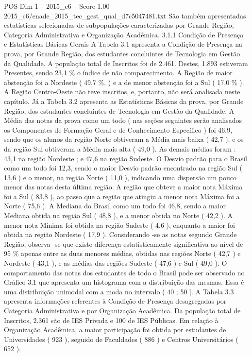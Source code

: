 \begin{textsample}{POS Dim 1 – 2015\_c6 – Score 1.00 – 2015\_c6/enade\_2015\_tec\_gest\_qual\_d7c5047481.txt}
São também apresentadas estatísticas selecionadas de subpopulações caracterizadas por Grande Região, Categoria Administrativa e Organização Acadêmica. 3.1.1 Condição de Presença e Estatísticas Básicas Gerais A Tabela 3.1 apresenta a Condição de Presença na prova, por Grande Região, dos estudantes concluintes de Tecnologia em Gestão da Qualidade.
A população total de Inscritos foi de 2.461.
Destes, 1.893 estiveram Presentes, sendo 23,1 \% o índice de não comparecimento.
A Região de maior abstenção foi a Nordeste ( 49,7 \%, ) e a de menor abstenção foi a Sul ( 17,0 \% ).
A Região Centro-Oeste não teve inscritos, e, portanto, não será analisada neste capítulo.
Já a Tabela 3.2 apresenta as Estatísticas Básicas da prova, por Grande Região, dos estudantes concluintes de Tecnologia em Gestão da Qualidade.
A Média das notas da prova como um todo ( nas seções seguintes serão analisados os Componentes de Formação Geral e de Conhecimento Específico ) foi 46,9, sendo que os alunos da região Norte obtiveram a Média mais baixa ( 42,7 ), e os da região Sul obtiveram a Média mais alta ( 49,0 ).
As demais médias foram : 43,1 na região Nordeste ; e 47,6 na região Sudeste.
O Desvio padrão para o Brasil como um todo foi 12,3, sendo o maior Desvio padrão encontrado na região Sul ( 13,6 ) e o menor, na região Norte ( 11,0 ), indicando uma dispersão um pouco menor das notas desta última região.
A região que obteve a maior nota Máxima foi a Sul ( 83,8 ), ao passo que a região que atingiu a menor nota Máxima foi a Norte ( 75,6 ).
A Mediana do Brasil como um todo foi 46,8, sendo a maior Mediana obtida na região Sul ( 48,8 ), e a menor obtida no Norte ( 42,2 ).
A menor nota Mínima foi obtida na região Sudeste ( 4,6 ), enquanto a maior foi obtida na região Nordeste ( 17,9 ).
Considerando -se as notas segundo Grande Região, observa -se que existe diferença estatisticamente significativa ao nível de 95 \% apenas entre as duas menores médias, obtidas nas regiões Norte ( 42,7 ) e Nordeste ( 43,1 ), e as médias das regiões Sudeste ( 47,6 ) e Sul ( 49,0 ).
O comportamento das notas dos estudantes de todo o Brasil pode ser observado no Gráfico 3.1 que apresenta um histograma com a distribuição das mesmas.
Essa é uma distribuição unimodal com a moda no intervalo ( 40 ; 50 ].
A Tabela 3.3 apresenta informações referentes à Condição de Presença desagregadas por Categoria Administrativa e por Organização Acadêmica.
Da população total de Inscritos, 2.361 são de IES Privada e 100 de IES Públicas.
Em relação à Organização Acadêmica, a maior participação foi obtida por estudantes de Universidades ( 923 ), seguido de Faculdades ( 886 ) e Centros Universitários ( 652 ).

\end{textsample}
